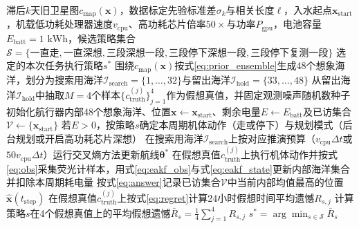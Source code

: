 \begin{algorithm}[htbp]
  \caption{基于数据标定留出想象海洋的出发前全任务预演}
  \label{alg:rehearsal}
  \begin{algorithmic}[1]
    \Require 滞后$k$天旧卫星图$c_{\text{map}}(\mathbf{x})$，数据标定先验标准差$\sigma_k$与相关长度$\ell$，入水起点$\mathbf{x}_{\text{start}}$，机载低功耗处理器速度$v_{\text{cpu}}$、高功耗芯片倍率$50\times$与功率$P_{\text{gpu}}$，电池容量$E_{\text{batt}}=1\text{ kWh}$，候选策略集合$\mathcal{S}=\{\text{一直走}, \text{一直深想}, \text{三段深想一段}, \text{三段停下深想一段}, \text{三段停下复测一段}\}$
    \Ensure 选定的本次任务执行策略$s^*$
    \State 围绕$c_{\text{map}}(\mathbf{x})$按式\eqref{eq:prior_ensemble}生成48个想象海洋，划分为搜索用海洋$\mathcal{I}_{\text{search}}=\{1,\dots,32\}$与留出海洋$\mathcal{I}_{\text{hold}}=\{33,\dots,48\}$
    \State 从留出海洋$\mathcal{I}_{\text{hold}}$中抽取$M=4$个样本$\{c_{\text{truth}}^{(j)}\}_{j=1}^4$作为假想真值，并固定观测噪声随机数种子
        \State 初始化航行器内部48个想象海洋、位置$\mathbf{x} \leftarrow \mathbf{x}_{\text{start}}$、剩余电量$E \leftarrow E_{\text{batt}}$及已访集合$\mathcal{V} \leftarrow \{\mathbf{x}_{\text{start}}\}$
          \State 若$E > 0$，按策略$s$确定本周期机体动作（走或停下）与规划模式（后台规划或开启高功耗芯片深想）
          \State 在搜索用海洋$\mathcal{I}_{\text{search}}$上按对应推演预算（$v_{\text{cpu}}\Delta t$或$50 v_{\text{cpu}}\Delta t$）运行交叉熵方法更新航线$\bm{\theta}^*$
          \State 在假想真值$c_{\text{truth}}^{(j)}$上执行机体动作并按式\eqref{eq:obs}采集荧光计样本，用式\eqref{eq:eakf_obs}与式\eqref{eq:eakf_state}更新内部海洋集合并扣除本周期耗电量
          \State 按式\eqref{eq:answer}记录已访集合$\mathcal{V}$中当前内部均值最高的位置$\hat{\mathbf{x}}(t_{\text{step}})$
        \EndFor
        \State 在假想真值$c_{\text{truth}}^{(j)}$上按式\eqref{eq:regret}计算24小时假想时间平均遗憾$R_{s,j}$
      \EndFor
      \State 计算策略$s$在4个假想真值上的平均假想遗憾$\bar{R}_s = \frac{1}{4}\sum_{j=1}^4 R_{s,j}$
    \EndFor
    \State \Return $s^* = \arg\min_{s\in\mathcal{S}} \bar{R}_s$
  \end{algorithmic}
\end{algorithm}


